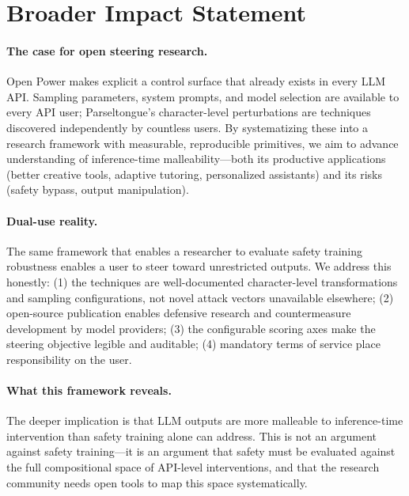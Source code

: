\documentclass[11pt]{article}
\begin{document}
\section*{Broader Impact Statement}

\paragraph{The case for open steering research.} Open Power makes explicit a control surface that already exists in every LLM API. Sampling parameters, system prompts, and model selection are available to every API user; Parseltongue's character-level perturbations are techniques discovered independently by countless users. By systematizing these into a research framework with measurable, reproducible primitives, we aim to advance understanding of inference-time malleability---both its productive applications (better creative tools, adaptive tutoring, personalized assistants) and its risks (safety bypass, output manipulation).

\paragraph{Dual-use reality.} The same framework that enables a researcher to evaluate safety training robustness enables a user to steer toward unrestricted outputs. We address this honestly: (1) the techniques are well-documented character-level transformations and sampling configurations, not novel attack vectors unavailable elsewhere; (2) open-source publication enables defensive research and countermeasure development by model providers; (3) the configurable scoring axes make the steering objective legible and auditable; (4) mandatory terms of service place responsibility on the user.

\paragraph{What this framework reveals.} The deeper implication is that LLM outputs are more malleable to inference-time intervention than safety training alone can address. This is not an argument against safety training---it is an argument that safety must be evaluated against the full compositional space of API-level interventions, and that the research community needs open tools to map this space systematically.
\end{document}

